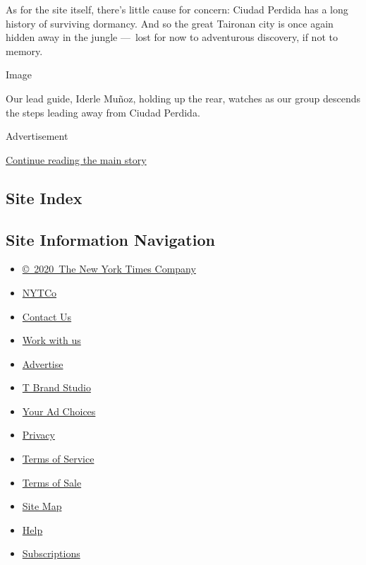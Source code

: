 As for the site itself, there's little cause for concern: Ciudad Perdida
has a long history of surviving dormancy. And so the great Taironan city
is once again hidden away in the jungle ---~lost for now to adventurous
discovery, if not to memory.

Image

Our lead guide, Iderle Muñoz, holding up the rear, watches as our group
descends the steps leading away from Ciudad Perdida.

Advertisement

\protect\hyperlink{after-bottom}{Continue reading the main story}

\hypertarget{site-index}{%
\subsection{Site Index}\label{site-index}}

\hypertarget{site-information-navigation}{%
\subsection{Site Information
Navigation}\label{site-information-navigation}}

\begin{itemize}
\tightlist
\item
  \href{https://help.nytimes.com/hc/en-us/articles/115014792127-Copyright-notice}{©~2020~The
  New York Times Company}
\end{itemize}

\begin{itemize}
\tightlist
\item
  \href{https://www.nytco.com/}{NYTCo}
\item
  \href{https://help.nytimes.com/hc/en-us/articles/115015385887-Contact-Us}{Contact
  Us}
\item
  \href{https://www.nytco.com/careers/}{Work with us}
\item
  \href{https://nytmediakit.com/}{Advertise}
\item
  \href{http://www.tbrandstudio.com/}{T Brand Studio}
\item
  \href{https://www.nytimes.com/privacy/cookie-policy\#how-do-i-manage-trackers}{Your
  Ad Choices}
\item
  \href{https://www.nytimes.com/privacy}{Privacy}
\item
  \href{https://help.nytimes.com/hc/en-us/articles/115014893428-Terms-of-service}{Terms
  of Service}
\item
  \href{https://help.nytimes.com/hc/en-us/articles/115014893968-Terms-of-sale}{Terms
  of Sale}
\item
  \href{https://spiderbites.nytimes.com}{Site Map}
\item
  \href{https://help.nytimes.com/hc/en-us}{Help}
\item
  \href{https://www.nytimes.com/subscription?campaignId=37WXW}{Subscriptions}
\end{itemize}
